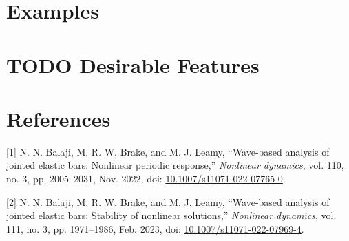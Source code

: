 \documentclass[11pt]{article}
\begin{document}
\section{Examples}
\label{sec:orgca7d00c}
\section{{\bfseries\sffamily TODO} Desirable Features}
\label{sec:org59a09dc}

\section{References}
\label{sec:org05d1d10}
\hypertarget{citeproc_bib_item_1}{[1] N. N. Balaji, M. R. W. Brake, and M. J. Leamy, “Wave-based analysis of jointed elastic bars: Nonlinear periodic response,” \textit{Nonlinear dynamics}, vol. 110, no. 3, pp. 2005–2031, Nov. 2022, doi: \href{https://doi.org/10.1007/s11071-022-07765-0}{10.1007/s11071-022-07765-0}.}

\hypertarget{citeproc_bib_item_2}{[2] N. N. Balaji, M. R. W. Brake, and M. J. Leamy, “Wave-based analysis of jointed elastic bars: Stability of nonlinear solutions,” \textit{Nonlinear dynamics}, vol. 111, no. 3, pp. 1971–1986, Feb. 2023, doi: \href{https://doi.org/10.1007/s11071-022-07969-4}{10.1007/s11071-022-07969-4}.}\bigskip
\end{document}
